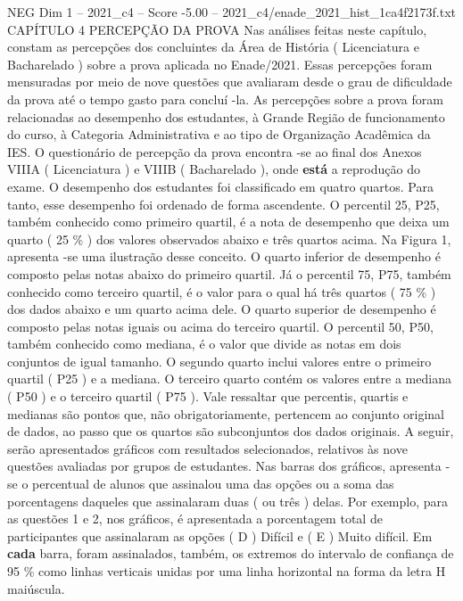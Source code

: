 \begin{textsample}{NEG Dim 1 – 2021\_c4 – Score -5.00 – 2021\_c4/enade\_2021\_hist\_1ca4f2173f.txt}  \label{ex:f1_neg_068}
CAPÍTULO 4 PERCEPÇÃO DA PROVA Nas análises feitas neste capítulo, constam as percepções dos concluintes da Área de História ( Licenciatura e Bacharelado ) sobre a prova aplicada no Enade/2021.
Essas percepções foram mensuradas por meio de nove questões que avaliaram desde o grau de dificuldade da prova até o tempo gasto para concluí -la.
As percepções sobre a prova foram relacionadas ao desempenho dos estudantes, à Grande Região de funcionamento do curso, à Categoria Administrativa e ao tipo de Organização Acadêmica da IES.
O questionário de percepção da prova encontra -se ao final dos Anexos VIIIA ( Licenciatura ) e VIIIB ( Bacharelado ), onde \textbf{está} a reprodução do exame.
O desempenho dos estudantes foi classificado em quatro quartos.
Para tanto, esse desempenho foi ordenado de forma ascendente.
O percentil 25, P25, também conhecido como primeiro quartil, é a nota de desempenho que deixa um quarto ( 25 \% ) dos valores observados abaixo e três quartos acima.
Na Figura 1, apresenta -se uma ilustração desse conceito.
O quarto inferior de desempenho é composto pelas notas abaixo do primeiro quartil.
Já o percentil 75, P75, também conhecido como terceiro quartil, é o valor para o qual há três quartos ( 75 \% ) dos dados abaixo e um quarto acima dele.
O quarto superior de desempenho é composto pelas notas iguais ou acima do terceiro quartil.
O percentil 50, P50, também conhecido como mediana, é o valor que divide as notas em dois conjuntos de igual tamanho.
O segundo quarto inclui valores entre o primeiro quartil ( P25 ) e a mediana.
O terceiro quarto contém os valores entre a mediana ( P50 ) e o terceiro quartil ( P75 ).
Vale ressaltar que percentis, quartis e medianas são pontos que, não obrigatoriamente, pertencem ao conjunto original de dados, ao passo que os quartos são subconjuntos dos dados originais.
A seguir, serão apresentados gráficos com resultados selecionados, relativos às nove questões avaliadas por grupos de estudantes.
Nas barras dos gráficos, apresenta -se o percentual de alunos que assinalou uma das opções ou a soma das porcentagens daqueles que assinalaram duas ( ou três ) delas.
Por exemplo, para as questões 1 e 2, nos gráficos, é apresentada a porcentagem total de participantes que assinalaram as opções ( D ) Difícil e ( E ) Muito difícil.
Em \textbf{cada} barra, foram assinalados, também, os extremos do intervalo de confiança de 95 \% como linhas verticais unidas por uma linha horizontal na forma da letra H maiúscula.

\end{textsample}
